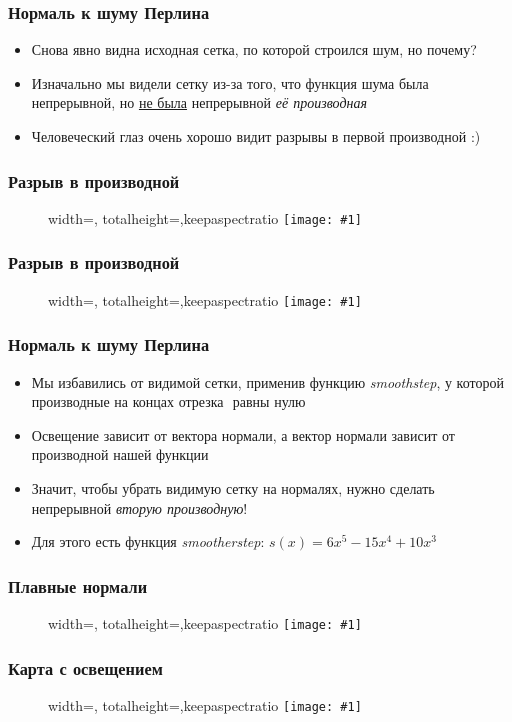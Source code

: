 \documentclass[10pt]{beamer}
\newcommand{\slideimage}[1]{
  \begin{figure}
    \begin{adjustbox}{width=\textwidth, totalheight=\textheight-2\baselineskip-2\baselineskip,keepaspectratio}
      \texttt{[image: \#1]}
    \end{adjustbox}
  \end{figure}
}
\begin{document}
\begin{frame}
\frametitle{Нормаль к шуму Перлина}
\begin{itemize}
\item Снова явно видна исходная сетка, по которой строился шум, но почему?
\pause
\item Изначально мы видели сетку из-за того, что функция шума была непрерывной, но \underline{не была} непрерывной \textit{её производная}
\pause
\item Человеческий глаз очень хорошо видит разрывы в первой производной :)
\end{itemize}
\end{frame}

\begin{frame}
\frametitle{Разрыв в производной}
\slideimage{plot.png}
\end{frame}

\begin{frame}
\frametitle{Разрыв в производной}
\slideimage{gradient.png}
\end{frame}

\begin{frame}
\frametitle{Нормаль к шуму Перлина}
\begin{itemize}
\item Мы избавились от видимой сетки, применив функцию \textit{smoothstep}, у которой производные на концах отрезка \begin{math}[0, 1]\end{math} равны нулю
\pause
\item Освещение зависит от вектора нормали, а вектор нормали зависит от производной нашей функции
\pause
\item Значит, чтобы убрать видимую сетку на нормалях, нужно сделать непрерывной \textit{вторую производную}!
\pause
\item Для этого есть функция \textit{smootherstep}: \begin{math}s(x)=6x^5-15x^4+10x^3\end{math}
\end{itemize}
\end{frame}

\begin{frame}
\frametitle{Плавные нормали}
\slideimage{perlin-normal-smooth.png}
\end{frame}

\begin{frame}
\frametitle{Карта с освещением}
\slideimage{perlin-shading.png}
\end{frame}
\end{document}
